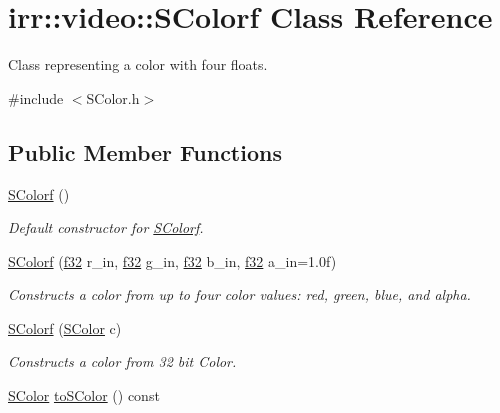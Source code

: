 \hypertarget{classirr_1_1video_1_1SColorf}{}\section{irr\+:\+:video\+:\+:S\+Colorf Class Reference}
\label{classirr_1_1video_1_1SColorf}


Class representing a color with four floats.  




{\ttfamily \#include $<$S\+Color.\+h$>$}

\subsection*{Public Member Functions}
\begin{DoxyCompactItemize}
\item 
\hyperlink{classirr_1_1video_1_1SColorf_a701ea1b449c2aae4a3dd44a13055ac3e}{S\+Colorf} ()
\begin{DoxyCompactList}\small\item\em Default constructor for \hyperlink{classirr_1_1video_1_1SColorf}{S\+Colorf}. \end{DoxyCompactList}\item 
\hyperlink{classirr_1_1video_1_1SColorf_a62956723325bc3712c051fbe50a6304b}{S\+Colorf} (\hyperlink{namespaceirr_a0277be98d67dc26ff93b1a6a1d086b07}{f32} r\+\_\+in, \hyperlink{namespaceirr_a0277be98d67dc26ff93b1a6a1d086b07}{f32} g\+\_\+in, \hyperlink{namespaceirr_a0277be98d67dc26ff93b1a6a1d086b07}{f32} b\+\_\+in, \hyperlink{namespaceirr_a0277be98d67dc26ff93b1a6a1d086b07}{f32} a\+\_\+in=1.\+0f)
\begin{DoxyCompactList}\small\item\em Constructs a color from up to four color values\+: red, green, blue, and alpha. \end{DoxyCompactList}\item 
\hyperlink{classirr_1_1video_1_1SColorf_a78bdda49d8605203acc99854cc9722b7}{S\+Colorf} (\hyperlink{classirr_1_1video_1_1SColor}{S\+Color} c)
\begin{DoxyCompactList}\small\item\em Constructs a color from 32 bit Color. \end{DoxyCompactList}\item 
\hyperlink{classirr_1_1video_1_1SColor}{S\+Color} \hyperlink{classirr_1_1video_1_1SColorf_a72ce02a50bf17d5a0017caa4cdddd4a1}{to\+S\+Color} () const \hypertarget{classirr_1_1video_1_1SColorf_a72ce02a50bf17d5a0017caa4cdddd4a1}{}\label{classirr_1_1video_1_1SColorf_a72ce02a50bf17d5a0017caa4cdddd4a1}


\end{DoxyCompactItemize}
